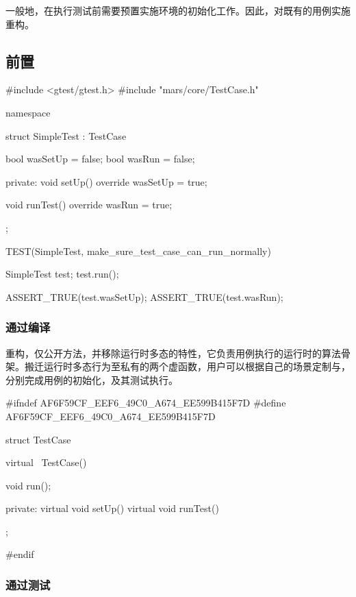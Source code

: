 \begin{content}

一般地，在执行测试前需要预置实施环境的初始化工作。因此，对既有的用例实施重构。

\subsection{前置}

\begin{leftbar}
 \begin{c++}[caption={\ttfamily{test/mars/core/TestCaseSpec.cc}}]
#include <gtest/gtest.h>
#include "mars/core/TestCase.h"

namespace {
  struct SimpleTest : TestCase {
    bool wasSetUp = false;
    bool wasRun = false;

  private:
    void setUp() override {
      wasSetUp = true;
    }

    void runTest() override {
      wasRun = true;
    }
  };
}

TEST(SimpleTest, make_sure_test_case_can_run_normally) {
  SimpleTest test;
  test.run();

  ASSERT_TRUE(test.wasSetUp);
  ASSERT_TRUE(test.wasRun);
}
 \end{c++}
\end{leftbar}

\subsubsection{通过编译}

重构，仅公开方法，并移除运行时多态的特性，它负责用例执行的运行时的算法骨架。搬迁运行时多态行为至私有的两个虚函数，用户可以根据自己的场景定制与，分别完成用例的初始化，及其测试执行。

\begin{leftbar}
 \begin{c++}[caption={\ttfamily{include/mars/core/TestCase.h}}]
#ifndef AF6F59CF_EEF6_49C0_A674_EE599B415F7D
#define AF6F59CF_EEF6_49C0_A674_EE599B415F7D

struct TestCase {
  virtual ~TestCase() {}

  void run();

private:
  virtual void setUp() {}
  virtual void runTest() {}
};

#endif
  \end{c++}
\end{leftbar}

\subsubsection{通过测试}


\end{content}
